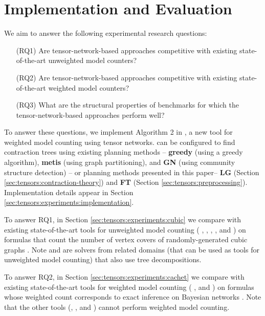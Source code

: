 \section{Implementation and Evaluation} \label{sec:tensors:experiments}
We aim to answer the following experimental research questions:
\begin{enumerate}
    \item[(RQ1)] Are tensor-network-based approaches competitive with existing state-of-the-art unweighted model counters?
    \item[(RQ2)] Are tensor-network-based approaches competitive with existing state-of-the-art weighted model counters?
    \item[(RQ3)] What are the structural properties of benchmarks for which the tensor-network-based approaches perform well?
\end{enumerate}

To answer these questions, we implement Algorithm 2 in , a new tool for weighted model counting using tensor networks.  can be configured to find contraction trees using existing planning methods -- \textbf{greedy} (using a greedy algorithm), \textbf{metis} (using graph partitioning), and \textbf{GN} (using community structure detection) \cite{KCMR18}-- or planning methods presented in this paper-- \textbf{LG} (Section \ref{sec:tensors:contraction-theory}) and \textbf{FT} (Section \ref{sec:tensors:preprocessing}). Implementation details appear in Section \ref{sec:tensors:experiments:implementation}.

To answer RQ1, in Section \ref{sec:tensors:experiments:cubic} we compare  with existing state-of-the-art tools for unweighted model counting ( \cite{CW16},  \cite{FHMW17},  \cite{Thurley2006},  \cite{SBK05},  \cite{OD15} and  \cite{LM17}) on formulas that count the number of vertex covers of randomly-generated cubic graphs \cite{KCMR18}. Note  and  are solvers from related domains (that can be used as tools for unweighted model counting) that also use tree decompositions.

To answer RQ2, in Section \ref{sec:tensors:experiments:cachet} we compare  with existing state-of-the-art tools for weighted model counting ( \cite{SBK05},  \cite{OD15} and  \cite{LM17}) on formulas whose weighted count corresponds to exact inference on Bayesian networks \cite{SBK05}. Note that the other tools (, , and ) cannot perform weighted model counting.

